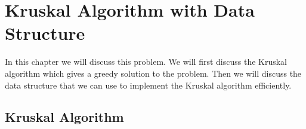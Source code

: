 \chapter{Kruskal Algorithm with Data Structure}
\begin{algoprob}
\end{algoprob}
In this chapter we will discuss this problem. We will first discuss the Kruskal algorithm which gives a greedy solution to the problem. Then we will discuss the data structure that we can use to implement the Kruskal algorithm efficiently. 
\section{Kruskal Algorithm}
